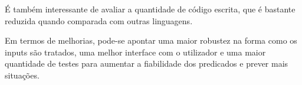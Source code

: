 \documentclass[paper=a4, fontsize=11pt]{scrartcl} %
\numberwithin{equation}{section} %
\numberwithin{figure}{section} %
\numberwithin{table}{section} %
\begin{document}
É também interessante de avaliar a quantidade de código escrita, que é bastante reduzida quando comparada com outras linguagens.

Em termos de melhorias, pode-se apontar uma maior robustez na forma como os inputs são tratados, uma melhor interface com o utilizador e uma maior quantidade de testes para aumentar a fiabilidade dos predicados e prever mais situações.




\renewcommand{\refname}{\spacedlowsmallcaps{Referências}} 

\nocite{swiPrologManual:2018}
\nocite{learnProlog:2012}

\end{document}
